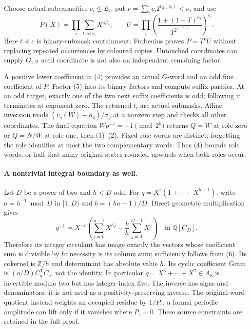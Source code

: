 \documentclass[10pt,a4paper]{article}
\begin{document}
Choose actual subcapacities $c_i\le E_i$, put
$\nu=\sum_i c_i2^{v_2(a_i)}<o$, and use
\[
 P(X)=\prod_i\sum_{t_i\preceq c_i}X^{a_it_i},\qquad
 U=\prod_i\left(\frac{1+(1+T)^{a_i}}{T^{2^{v_2(a_i)}}}\right)^{c_i}. \tag{5}
\]
Here $t\preceq c$ is binary-submask containment. Frobenius proves
$\overline P=T^\nu U$ without replacing repeated occurrences by coloured
copies. Untouched coordinates can supply $G$; a used coordinate is not also
an independent remaining factor.

A positive lower coefficient in (4) provides an actual $G$-word and an odd
fine coefficient of $P$. Factor (5) into its binary factors and compute suffix
parities. At an odd target, exactly one of the two next suffix coefficients
is odd; following it terminates at exponent zero. The returned $t_i$ are
actual submasks. Affine inversion reads
$(v_q(W)-a_q)/\sigma_q$ at a nonzero step and checks all other coordinates.
The final equation $Wp^{-\varepsilon}=-1\pmod{2^k}$ returns $Q=W$ at role zero
or $Q=N/W$ at role one, then (1)--(2). Fixed-role words are distinct; forgetting
the role identifies at most the two complementary words. Thus (4) bounds role
words, or half that many original states rounded upwards when both roles occur.

\paragraph{A nontrivial integral boundary as well.}
Let $D$ be a power of two and $h<D$ odd. For $q=X^r(1+\cdots+X^{h-1})$, write
$a=h^{-1}\bmod D$ in $[1,D)$ and $b=(ha-1)/D$. Direct geometric multiplication gives
\[
 q^{-1}=X^{-r}\left(\sum_{j=0}^{a-1}X^{hj}-\frac bh\sum_{j=0}^{D-1}X^j\right)
 \quad\text{in }\mathbb Q[C_D].                            \tag{6}
\]
Therefore its integer circulant has image exactly the vectors whose coefficient
sum is divisible by $h$: necessity is its column sum; sufficiency follows from
(6). Its cokernel is $\mathbb Z/h$ and determinant has absolute value $h$.
Its cyclic coefficient Gram is $(o/D)C_q^{\mathsf T}C_q$, not the identity.
In particular $q=X^3+\cdots+X^7\in A_8$ is invertible modulo two but has integer
index five. The inverse has signs and denominators; it is not used as a
positivity-preserving inverse. The original-word quotient instead weights an occupied
residue by $1/P_r$; a formal periodic amplitude can lift only if it vanishes
where $P_r=0$. These source constraints are retained in the full proof.
\end{document}

